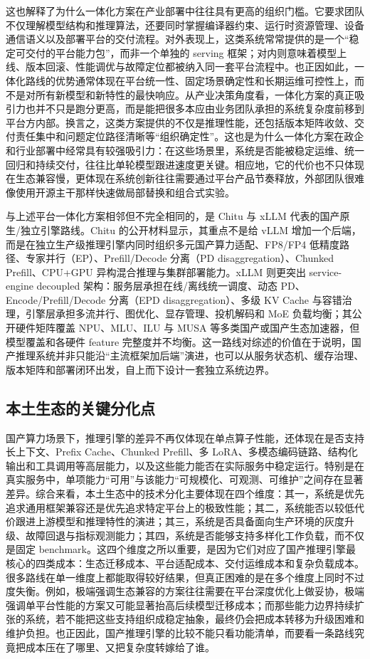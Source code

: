 这也解释了为什么一体化方案在产业部署中往往具有更高的组织门槛。它要求团队不仅理解模型结构和推理算法，还要同时掌握编译器约束、运行时资源管理、设备通信语义以及部署平台的交付流程。对外表现上，这类系统常常提供的是一个“稳定可交付的平台能力包”，而非一个单独的 serving 框架；对内则意味着模型上线、版本回滚、性能调优与故障定位都被纳入同一套平台流程中。也正因如此，一体化路线的优势通常体现在平台统一性、固定场景确定性和长期运维可控性上，而不是对所有新模型和新特性的最快响应。从产业决策角度看，一体化方案的真正吸引力也并不只是跑分更高，而是能把很多本应由业务团队承担的系统复杂度前移到平台方内部。换言之，这类方案提供的不仅是推理性能，还包括版本矩阵收敛、交付责任集中和问题定位路径清晰等“组织确定性”。这也是为什么一体化方案在政企和行业部署中经常具有较强吸引力：在这些场景里，系统是否能被稳定运维、统一回归和持续交付，往往比单轮模型跟进速度更关键。相应地，它的代价也不只体现在生态兼容慢，更体现在系统创新往往需要通过平台产品节奏释放，外部团队很难像使用开源主干那样快速做局部替换和组合式实验。

与上述平台一体化方案相邻但不完全相同的，是 Chitu 与 xLLM 代表的国产原生/独立引擎路线。Chitu 的公开材料显示，其重点不是给 vLLM 增加一个后端，而是在独立生产级推理引擎内同时组织多元国产算力适配、FP8/FP4 低精度路径、专家并行（EP）、Prefill/Decode 分离（PD disaggregation）、Chunked Prefill、CPU+GPU 异构混合推理与集群部署能力\citep{chitu_tsinghua_news,chitu_github}。xLLM 则更突出 service-engine decoupled 架构：服务层承担在线/离线统一调度、动态 PD、Encode/Prefill/Decode 分离（EPD disaggregation）、多级 KV Cache 与容错治理，引擎层承担多流并行、图优化、显存管理、投机解码和 MoE 负载均衡；其公开硬件矩阵覆盖 NPU、MLU、ILU 与 MUSA 等多类国产或国产生态加速器，但模型覆盖和各硬件 feature 完整度并不均衡\citep{xllm_docs,xllm_service,xllm_tech_report}。这一路线对综述的价值在于说明，国产推理系统并非只能沿“主流框架加后端”演进，也可以从服务状态机、缓存治理、版本矩阵和部署闭环出发，自上而下设计一套独立系统边界。

\subsection{本土生态的关键分化点}

国产算力场景下，推理引擎的差异不再仅体现在单点算子性能，还体现在是否支持长上下文、Prefix Cache、Chunked Prefill、多 LoRA、多模态编码链路、结构化输出和工具调用等高层能力，以及这些能力能否在实际服务中稳定运行。特别是在真实服务中，单项能力“可用”与该能力“可规模化、可观测、可维护”之间存在显著差异。综合来看，本土生态中的技术分化主要体现在四个维度：其一，系统是优先追求通用框架兼容还是优先追求特定平台上的极致性能；其二，系统能否以较低代价跟进上游模型和推理特性的演进；其三，系统是否具备面向生产环境的灰度升级、故障回退与指标观测能力；其四，系统是否能够支持多样化工作负载，而不仅是固定 benchmark。这四个维度之所以重要，是因为它们对应了国产推理引擎最核心的四类成本：生态迁移成本、平台适配成本、交付运维成本和复杂负载成本。很多路线在单一维度上都能取得较好结果，但真正困难的是在多个维度上同时不过度失衡。例如，极端强调生态兼容的方案往往需要在平台深度优化上做妥协，极端强调单平台性能的方案又可能显著抬高后续模型迁移成本；而那些能力边界持续扩张的系统，若不能把这些支持组织成稳定抽象，最终仍会把成本转移为升级困难和维护负担。也正因此，国产推理引擎的比较不能只看功能清单，而要看一条路线究竟把成本压在了哪里、又把复杂度转嫁给了谁。

